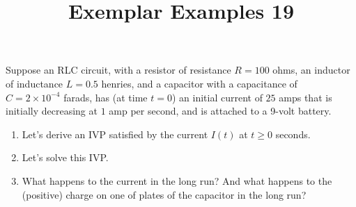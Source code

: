 \documentclass{ximera}
\begin{document}
\begin{abstract}
 \end{abstract}

    \title{Exemplar Examples 19}
    
    \maketitle

Suppose an RLC circuit, with a resistor of resistance $R=100$ ohms, an inductor of inductance $L=0.5$ henries, and a capacitor with a capacitance of \\$C=2\times 10^{-4}$ farads, has (at time $t=0$) an initial current of $25$ amps that is initially decreasing at $1$ amp per second, and is attached to a 9-volt battery.

\begin{enumerate}

\item Let's derive an IVP satisfied by the current $I(t)$ at $t\geq 0$ seconds.

\vfill






\item Let's solve this IVP.

\vfill
\vfill








\newpage

\item What happens to the current in the long run?  And what happens to the (positive) charge on one of plates of the capacitor in the long run?





\end{enumerate}
\end{document}
